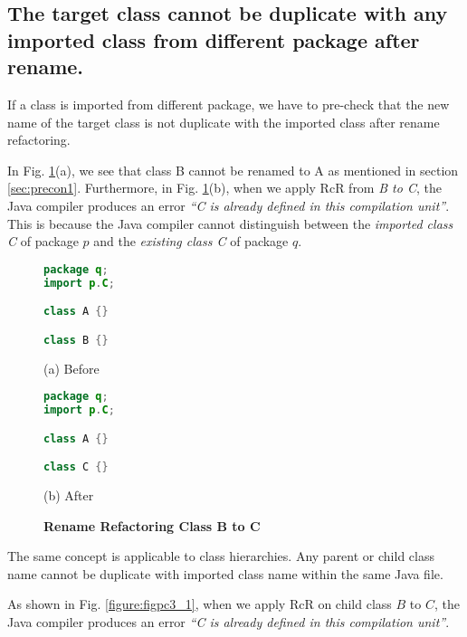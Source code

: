 \subsection{The target class cannot be duplicate with any imported class from different package after rename.}

If a class is imported from different package, we have to pre-check that the new name of the target class is not duplicate with the imported class after rename refactoring. 

In Fig. \ref{figure:fig2}(a), we see that class B cannot be renamed to A as mentioned in section \ref{sec:precon1}. Furthermore, in Fig. \ref{figure:fig2}(b), when we apply RcR from \emph{B to C}, the Java compiler produces an error \textit{``C is already defined in this compilation unit''}. This is because the Java compiler cannot distinguish between the \emph{imported class C} of package $p$ and the \emph{existing class C} of package $q$. 

\begin{figure}[th]
\centering
\begin{minipage}[t]{0.4\linewidth}
\begin{lstlisting}[language=java, basicstyle=\scriptsize\ttfamily,frame=single]
package q;
import p.C;

class A {}

class B {} 
\end{lstlisting}
\centering(a) Before
\end{minipage}
\hfill
\begin{minipage}[t]{0.4\linewidth}
\begin{lstlisting}[language=java, basicstyle=\scriptsize\ttfamily,frame=single]
package q;
import p.C;

class A {}

class C {} 
\end{lstlisting}
\centering(b) After
\end{minipage}
\caption{\textbf{Rename Refactoring Class B to C}}
\label{figure:fig2}
\end{figure}


The same concept is applicable to class hierarchies. Any parent or child class name cannot be duplicate with imported class name within the same Java file. 

As shown in Fig. \ref{figure:figpc3_1}, when we apply RcR on child class $B$ to $C$, the Java compiler produces an error \textit{``C is already defined in this compilation unit''}.  

